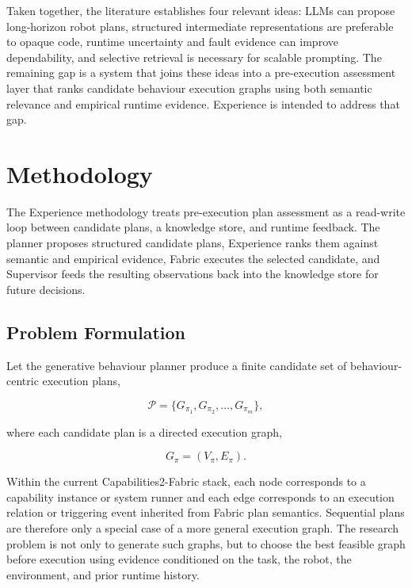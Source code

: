 \documentclass[letterpaper, 10pt, conference]{ieeeconf}
\begin{document}
Taken together, the literature establishes four relevant ideas: LLMs can propose long-horizon robot plans, structured intermediate representations are preferable to opaque code, runtime uncertainty and fault evidence can improve dependability, and selective retrieval is necessary for scalable prompting. The remaining gap is a system that joins these ideas into a pre-execution assessment layer that ranks candidate behaviour execution graphs using both semantic relevance and empirical runtime evidence. Experience is intended to address that gap.

\section{Methodology}

The Experience methodology treats pre-execution plan assessment as a read-write loop between candidate plans, a knowledge store, and runtime feedback. The planner proposes structured candidate plans, Experience ranks them against semantic and empirical evidence, Fabric executes the selected candidate, and Supervisor feeds the resulting observations back into the knowledge store for future decisions.

\subsection{Problem Formulation}

Let the generative behaviour planner produce a finite candidate set of behaviour-centric execution plans,

\begin{equation}
\mathcal{P}=\{G_{\pi_1}, G_{\pi_2}, \ldots, G_{\pi_m}\},
\end{equation}

where each candidate plan is a directed execution graph,

\begin{equation}
G_{\pi}=(V_{\pi}, E_{\pi}).
\end{equation}

Within the current Capabilities2-Fabric stack, each node corresponds to a capability instance or system runner and each edge corresponds to an execution relation or triggering event inherited from Fabric plan semantics. Sequential plans are therefore only a special case of a more general execution graph. The research problem is not only to generate such graphs, but to choose the best feasible graph before execution using evidence conditioned on the task, the robot, the environment, and prior runtime history.
\end{document}
